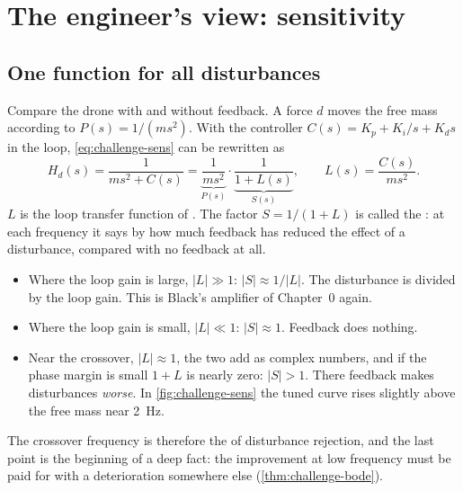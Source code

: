\section{The engineer's view: sensitivity}

\subsection{One function for all disturbances}
Compare the drone with and without feedback. A force $d$ moves the free mass according to $P(s) = 1/(ms^2)$. With the controller $C(s) = K_p + K_i/s + K_ds$ in the loop, \cref{eq:challenge-sens} can be rewritten as
\begin{equation}\label{eq:challenge-S}
  H_d(s) = \frac{1}{ms^2 + C(s)} = \underbrace{\frac{1}{ms^2}}_{P(s)}\cdot\underbrace{\frac{1}{1 + L(s)}}_{S(s)}, \qquad L(s) = \frac{C(s)}{ms^2} .
\end{equation}
$L$ is the loop transfer function of . The factor $S = 1/(1 + L)$ is called the : at each frequency it says by how much feedback has reduced the effect of a disturbance, compared with no feedback at all.

\begin{itemize}
  \item Where the loop gain is large, $|L| \gg 1$: $|S| \approx 1/|L|$. The disturbance is divided by the loop gain. This is Black's amplifier of Chapter~0 again.
  \item Where the loop gain is small, $|L| \ll 1$: $|S| \approx 1$. Feedback does nothing.
  \item Near the crossover, $|L| \approx 1$, the two add as complex numbers, and if the phase margin is small $1 + L$ is nearly zero: $|S| > 1$. There feedback makes disturbances \emph{worse}. In \cref{fig:challenge-sens} the tuned curve rises slightly above the free mass near \SI{2}{Hz}.
\end{itemize}
The crossover frequency is therefore the  of disturbance rejection, and the last point is the beginning of a deep fact: the improvement at low frequency must be paid for with a deterioration somewhere else (\cref{thm:challenge-bode}).

